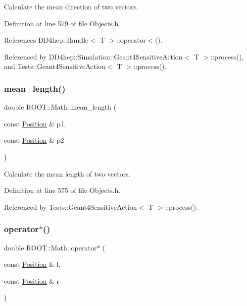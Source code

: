 Calculate the mean direction of two vectors. 



Definition at line 579 of file Objects.\+h.



References D\+D4hep\+::\+Handle$<$ T $>$\+::operator$<$().



Referenced by D\+D4hep\+::\+Simulation\+::\+Geant4\+Sensitive\+Action$<$ T $>$\+::process(), and Tests\+::\+Geant4\+Sensitive\+Action$<$ T $>$\+::process().

\hypertarget{namespace_r_o_o_t_1_1_math_ae1d6c364099dacd36db12d2ece5adb9c}{}\label{namespace_r_o_o_t_1_1_math_ae1d6c364099dacd36db12d2ece5adb9c} 
\subsubsection{\texorpdfstring{mean\+\_\+length()}{mean\_length()}}
{\footnotesize\ttfamily double R\+O\+O\+T\+::\+Math\+::mean\+\_\+length (\begin{DoxyParamCaption}\item[{const \hyperlink{namespace_r_o_o_t_1_1_math_ac2622efe8212cb8b8a8893efd5117de8}{Position} \&}]{p1,  }\item[{const \hyperlink{namespace_r_o_o_t_1_1_math_ac2622efe8212cb8b8a8893efd5117de8}{Position} \&}]{p2 }\end{DoxyParamCaption})\hspace{0.3cm}{\ttfamily [inline]}}



Calculate the mean length of two vectors. 



Definition at line 575 of file Objects.\+h.



Referenced by Tests\+::\+Geant4\+Sensitive\+Action$<$ T $>$\+::process().

\hypertarget{namespace_r_o_o_t_1_1_math_ad7a11e4384dc9dcc6a3e4e892391f26b}{}\label{namespace_r_o_o_t_1_1_math_ad7a11e4384dc9dcc6a3e4e892391f26b} 
\subsubsection{\texorpdfstring{operator$\ast$()}{operator*()}}
{\footnotesize\ttfamily double R\+O\+O\+T\+::\+Math\+::operator$\ast$ (\begin{DoxyParamCaption}\item[{const \hyperlink{namespace_r_o_o_t_1_1_math_ac2622efe8212cb8b8a8893efd5117de8}{Position} \&}]{l,  }\item[{const \hyperlink{namespace_r_o_o_t_1_1_math_ac2622efe8212cb8b8a8893efd5117de8}{Position} \&}]{r }\end{DoxyParamCaption})\hspace{0.3cm}{\ttfamily [inline]}}



